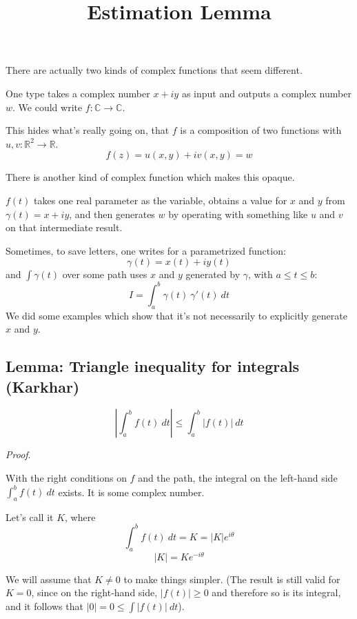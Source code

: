 \documentclass[11pt, oneside]{article}
\title{Estimation Lemma}
\date{}
\begin{document}
\maketitle
\Large

There are actually two kinds of complex functions that seem different.  

One type takes a complex number $x + iy$ as input and outputs a complex number $w$.  We could write $f: \mathbb{C} \rightarrow \mathbb{C}$.

This hides what's really going on, that $f$ is a composition of two functions with $u,v: \mathbb{R}^2 \rightarrow \mathbb{R}$.
\[ f(z) = u(x,y) + i v(x,y) = w \]

There is another kind of complex function which makes this opaque.  

$f(t)$ takes one real parameter as the variable, obtains a value for $x$ and $y$ from $\gamma(t) = x + iy$, and then generates $w$ by operating with something like $u$ and $v$ on that intermediate result.

Sometimes, to save letters, one writes for a parametrized function:
\[ \gamma(t) = x(t) + i y(t) \]
and $\int \gamma(t)$ over some path uses $x$ and $y$ generated by $\gamma$, with $a \le t \le b$:
\[ I = \int_a^b \gamma(t) \ \gamma'(t) \ dt \]
We did some examples which show that it's not necessarily to explicitly generate $x$ and $y$.


\subsection*{Lemma:  Triangle inequality for integrals (Karkhar)}

\label{sec:tri_inequality_integrals}

\[ | \int_a^b f(t) \ dt | \le \int_a^b |f(t)| \ dt \]

\emph{Proof}.

With the right conditions on $f$ and the path, the integral on the left-hand side $\int_a^b f(t) \ dt$ exists.  It is some complex number.

Let's call it $K$, where  
\[ \int_a^b f(t) \ dt = K = |K| e^{i \theta} \]
\[ |K| = K e^{-i \theta} \]

We will assume that $K \ne 0$ to make things simpler.  (The result is still valid for $K = 0$, since on the right-hand side, $|f(t)| \ge 0$ and therefore so is its integral, and it follows that $|0| = 0 \le \int |f(t)| \ dt$).
\end{document}
